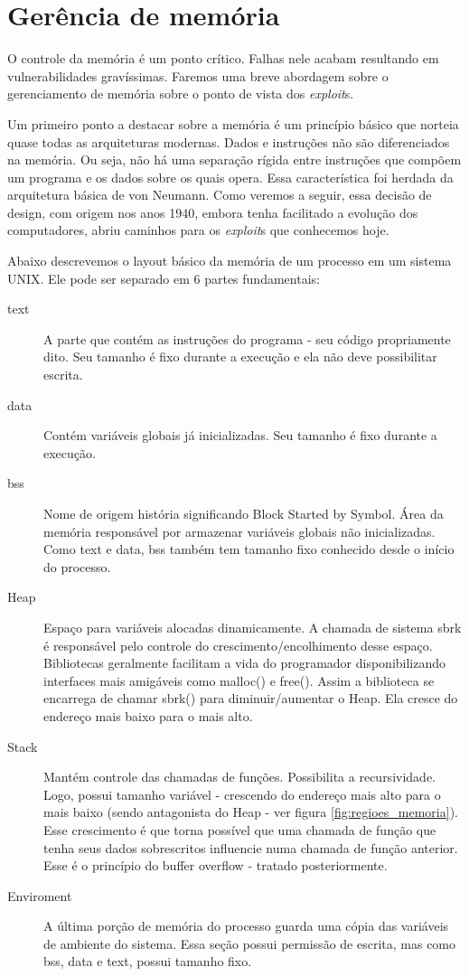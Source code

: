 	\section{Gerência de memória}
	\label{sec:gerencia_memoria}
	O controle da memória é um ponto crítico. Falhas nele acabam resultando em vulnerabilidades 
	gravíssimas. Faremos uma breve abordagem sobre o gerenciamento de memória sobre
	o ponto de vista dos \textsl{exploit}s.

	Um primeiro ponto a destacar sobre a memória é um princípio básico que norteia
	quase todas as arquiteturas modernas. Dados e instruções não são diferenciados na memória.
	Ou seja, não há uma separação rígida entre instruções que compõem um programa e os dados
	sobre os quais opera. Essa característica foi herdada da arquitetura básica de von Neumann.
	Como veremos a seguir, essa decisão de design, com origem nos anos 1940, embora tenha
	facilitado a evolução dos computadores, abriu caminhos para os \textsl{exploit}s que conhecemos hoje. 

	Abaixo descrevemos o layout básico da memória de um processo em um sistema UNIX.
	Ele pode ser separado em 6 partes fundamentais:
	\begin{description}
		\item[text]
			A parte que contém as instruções do programa - seu código propriamente dito.
			Seu tamanho é fixo durante a execução e ela não deve possibilitar escrita.
		\item[data]
			Contém variáveis globais já inicializadas. Seu tamanho é fixo durante a execução.
		\item[bss]
			Nome de origem história significando Block Started by Symbol. Área da memória responsável
			por armazenar variáveis globais	não inicializadas. Como text e data, bss também tem tamanho 
			fixo conhecido desde o início do processo. 
		\item[Heap]
			Espaço para variáveis alocadas dinamicamente. A chamada de sistema sbrk é responsável
			pelo controle do crescimento/encolhimento desse espaço. Bibliotecas geralmente facilitam a vida
			do programador disponibilizando interfaces mais amigáveis como malloc() e free(). Assim a biblioteca
			se encarrega de chamar sbrk() para diminuir/aumentar o Heap. Ela cresce do endereço mais baixo para o
			mais alto.
		\item[Stack]
			Mantém controle das chamadas de funções. Possibilita a recursividade. Logo, possui
			tamanho variável - crescendo do endereço mais alto para o mais baixo (sendo antagonista do Heap - ver
			figura \ref{fig:regioes_memoria}). 
			Esse crescimento é que torna possível que uma chamada de função que tenha seus dados
			sobrescritos influencie numa chamada de função anterior. Esse é o princípio do buffer overflow - tratado
			posteriormente.
		\item[Enviroment]
			A última porção de memória do processo guarda uma cópia das variáveis de ambiente do sistema.
			Essa seção possui permissão de escrita, mas como bss, data e text, possui tamanho fixo.
	\end{description}

